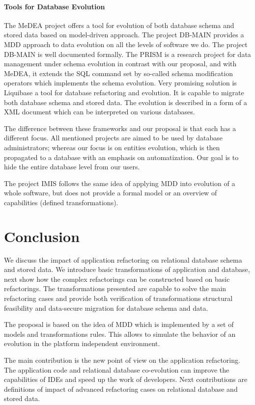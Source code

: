 \documentclass[runningheads]{comsis}
\begin{document}
\paragraph{Tools for Database Evolution} The MeDEA project \cite{Meda:Main} offers a tool for evolution of both database schema and stored data based on model-driven approach. The project DB-MAIN \cite{Hick:DBMAIN} provides a MDD approach to data evolution on all the levels of software we do. The project DB-MAIN is well documented formally. The PRISM is a research project for data management under schema evolution \cite{PRISM} in contrast with our proposal, and with MeDEA, it extends the SQL command set by so-called schema modification operators which implements the schema evolution.  Very promising solution is Liquibase \cite{Liquibase} a tool for database refactoring and evolution. It is capable to migrate both database schema and stored data. The evolution is described in a form of a XML document which can be interpreted on various databases. 

The difference between these frameworks and our proposal is that each has a different focus. All mentioned projects are aimed to  be used by database administrators; whereas our focus is on entities evolution, which is then propagated to a database with an emphasis on automatization. Our goal is to hide the entire database level from our users.

The project IMIS \cite{Bordbar:ModelBasedMigration} follows the same idea of applying MDD into evolution of a whole software, but does not provide a formal model or an overview of capabilities (defined transformations).

\section{Conclusion}
We discuss the impact of application refactoring on relational database schema and stored data. We introduce basic transformations of application and database, next show how the complex refactorings can be constructed based on basic refactorings. The transformations presented are capable to solve the main refactoring cases and provide both verification of transformations structural feasibility and data-secure migration for database schema and data. 

The proposal is based on the idea of MDD which is implemented by a set of models and transformations rules. This allows to simulate the behavior of an evolution in the platform independent environment.

The main contribution is the new point of view on the application refactoring. The application code and relational database co-evolution can improve the capabilities of IDEs and speed up the work of developers. Next contributions are definitions of impact of advanced refactoring cases on relational database and stored data.

     
   
\end{document}

